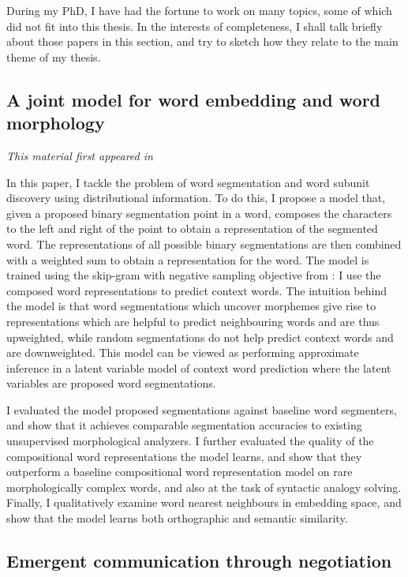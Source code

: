 During my PhD, I have had the fortune to work on many topics, some of which did not fit into this thesis. In the interests of completeness, I shall talk briefly about those papers in this section, and try to sketch how they relate to the main theme of my thesis.

\subsection{A joint model for word embedding and word morphology}

\textit{This material first appeared in \citet{Cao:16}}

In this paper, I tackle the problem of word segmentation and word subunit discovery using distributional information. To do this, I propose a model that, given a proposed binary segmentation point in a word, composes the characters to the left and right of the point to obtain a representation of the segmented word. The representations of all possible binary segmentations are then combined with a weighted sum to obtain a representation for the word. The model is trained using the skip-gram with negative sampling objective from \citet{Mikolov:13}: I use  the composed word representations to predict context words. The intuition behind the model is that word segmentations which uncover morphemes give rise to representations which are helpful to predict neighbouring words and are thus upweighted, while random segmentations do not help predict context words and are downweighted. This model can be viewed as performing approximate inference in a latent variable model of context word prediction where the latent variables are proposed word segmentations.

I evaluated the model proposed segmentations against baseline word segmenters, and show that it achieves comparable segmentation accuracies to existing unsupervised morphological analyzers. I further evaluated the quality of the compositional word representations the model learns, and show that they outperform a baseline compositional word representation model on rare morphologically complex words, and also at the task of syntactic analogy solving. Finally, I qualitatively examine word nearest neighbours in embedding space, and show that the model learns both orthographic and semantic similarity.

\subsection{Emergent communication through negotiation}

